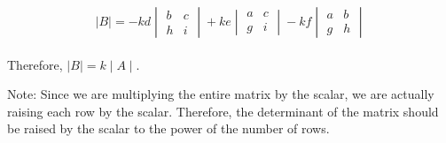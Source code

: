 \documentclass[oneside]{book}
\begin{document}
\[
    \mid B \mid = -kd \begin{vmatrix}
        b & c\\
        h & i
    \end{vmatrix} + ke \begin{vmatrix}
        a & c\\
        g & i
    \end{vmatrix} - kf \begin{vmatrix}
        a & b\\
        g & h
    \end{vmatrix}
\]\\

Therefore, $\mid B \mid = k \mid A \mid$.\\
\newpage
{}

Note: Since we are multiplying the entire matrix by the scalar, we are actually raising each row by the scalar. Therefore, the determinant of the matrix should be raised by the scalar to the power of the number of rows.  
\end{document}
